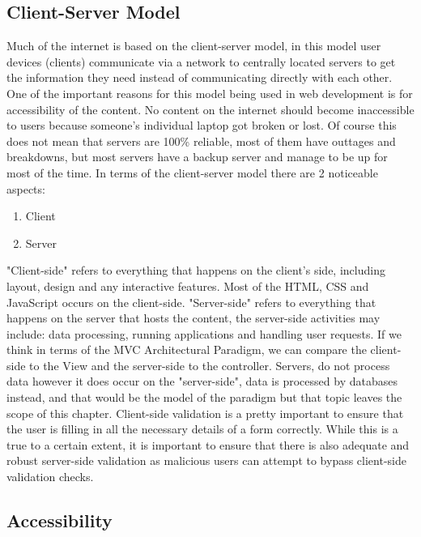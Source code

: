 \documentclass[11pt]{article}
\begin{document}
\subsection{Client-Server Model}
\label{sec:orgb3d4bf8}
Much of the internet is based on the client-server model, in this model user devices (clients)
communicate via a network to centrally located servers to get the information they need instead of
communicating directly with each other. One of the important reasons for this model being used in
web development is for accessibility of the content. No content on the internet should become
inaccessible to users because someone's individual laptop got broken or lost. Of course this does
not mean that servers are 100\% reliable, most of them have outtages and breakdowns, but most servers
have a backup server and manage to be up for most of the time.
In terms of the client-server model there are 2 noticeable aspects:
\begin{enumerate}
\item Client
\item Server
\end{enumerate}
"Client-side" refers to everything that happens on the client's side, including layout, design and
any interactive features. Most of the HTML, CSS and JavaScript occurs on the client-side.
"Server-side" refers to everything that happens on the server that hosts the content, the
server-side activities may include: data processing, running applications and handling user
requests.
If we think in terms of the MVC Architectural Paradigm, we can compare the client-side to the View
and the server-side to the controller. Servers, do not process data however it does occur on the
"server-side", data is processed by databases instead, and that would be the model of the paradigm
but that topic leaves the scope of this chapter.
Client-side validation is a pretty important to ensure that the user is filling in all the necessary
details of a form correctly. While this is a true to a certain extent, it is important to ensure
that there is also adequate and robust server-side validation as malicious users can attempt to bypass
client-side validation checks.
\subsection{Accessibility}
\label{sec:orgbc160b6}
\end{document}
